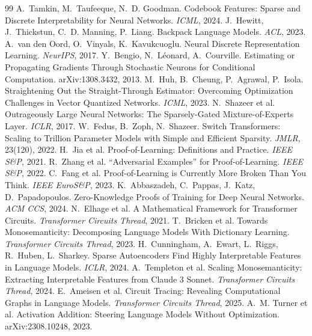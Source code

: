 \documentclass[10pt,twocolumn]{article}
\begin{document}
\begin{thebibliography}{99}\footnotesize
{} A.~Tamkin, M.~Taufeeque, N.~D. Goodman. Codebook Features: Sparse and Discrete Interpretability for Neural Networks. \emph{ICML}, 2024.
 J.~Hewitt, J.~Thickstun, C.~D. Manning, P.~Liang. Backpack Language Models. \emph{ACL}, 2023.
 A.~van den Oord, O.~Vinyals, K.~Kavukcuoglu. Neural Discrete Representation Learning. \emph{NeurIPS}, 2017.
 Y.~Bengio, N.~L\'eonard, A.~Courville. Estimating or Propagating Gradients Through Stochastic Neurons for Conditional Computation. arXiv:1308.3432, 2013.
 M.~Huh, B.~Cheung, P.~Agrawal, P.~Isola. Straightening Out the Straight-Through Estimator: Overcoming Optimization Challenges in Vector Quantized Networks. \emph{ICML}, 2023.
 N.~Shazeer et al. Outrageously Large Neural Networks: The Sparsely-Gated Mixture-of-Experts Layer. \emph{ICLR}, 2017.
 W.~Fedus, B.~Zoph, N.~Shazeer. Switch Transformers: Scaling to Trillion Parameter Models with Simple and Efficient Sparsity. \emph{JMLR}, 23(120), 2022.
 H.~Jia et al. Proof-of-Learning: Definitions and Practice. \emph{IEEE S\&P}, 2021.
 R.~Zhang et al. ``Adversarial Examples'' for Proof-of-Learning. \emph{IEEE S\&P}, 2022.
 C.~Fang et al. Proof-of-Learning is Currently More Broken Than You Think. \emph{IEEE EuroS\&P}, 2023.
 K.~Abbaszadeh, C.~Pappas, J.~Katz, D.~Papadopoulos. Zero-Knowledge Proofs of Training for Deep Neural Networks. \emph{ACM CCS}, 2024.
 N.~Elhage et al. A Mathematical Framework for Transformer Circuits. \emph{Transformer Circuits Thread}, 2021.
 T.~Bricken et al. Towards Monosemanticity: Decomposing Language Models With Dictionary Learning. \emph{Transformer Circuits Thread}, 2023.
 H.~Cunningham, A.~Ewart, L.~Riggs, R.~Huben, L.~Sharkey. Sparse Autoencoders Find Highly Interpretable Features in Language Models. \emph{ICLR}, 2024.
 A.~Templeton et al. Scaling Monosemanticity: Extracting Interpretable Features from Claude 3 Sonnet. \emph{Transformer Circuits Thread}, 2024.
 E.~Ameisen et al. Circuit Tracing: Revealing Computational Graphs in Language Models. \emph{Transformer Circuits Thread}, 2025.
 A.~M. Turner et al. Activation Addition: Steering Language Models Without Optimization. arXiv:2308.10248, 2023.

\end{thebibliography}
\end{document}
